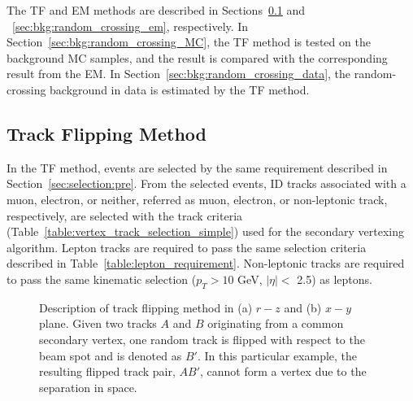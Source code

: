 The TF and EM methods are described in Sections~\ref{sec:bkg:random_crossing_tf} and ~\ref{sec:bkg:random_crossing_em}, respectively. In Section~\ref{sec:bkg:random_crossing_MC}, the TF method is tested on the background MC samples, and the result is compared with the corresponding result from the EM. In Section~\ref{sec:bkg:random_crossing_data}, the random-crossing background in data is estimated by the TF method.%

\subsection{Track Flipping Method}
\label{sec:bkg:random_crossing_tf}

In the TF method, events are selected by the same requirement described in Section~\ref{sec:selection:pre}. From the selected events, ID tracks associated with a muon, electron, or neither, referred as muon, electron, or non-leptonic track, respectively, are selected with the track criteria (Table~\ref{table:vertex_track_selection_simple}) used for the secondary vertexing algorithm. Lepton tracks are required to pass the same selection criteria described in Table~\ref{table:lepton_requirement}. Non-leptonic tracks are required to pass the same kinematic selection ($p_{T} > 10$ GeV, $|\eta| < $ 2.5) as leptons.

\begin{figure}[!htb]
	\centering
	\caption{Description of track flipping method in (a) $r-z$ and (b) $x-y$ plane. Given two tracks $A$ and $B$ originating from a common secondary vertex, one random track is flipped with respect to the beam spot and is denoted as $B'$. In this particular example, the resulting flipped track pair, $AB'$, cannot form a vertex due to the separation in space.}
	\label{fig:TF_diagram}
\end{figure}

